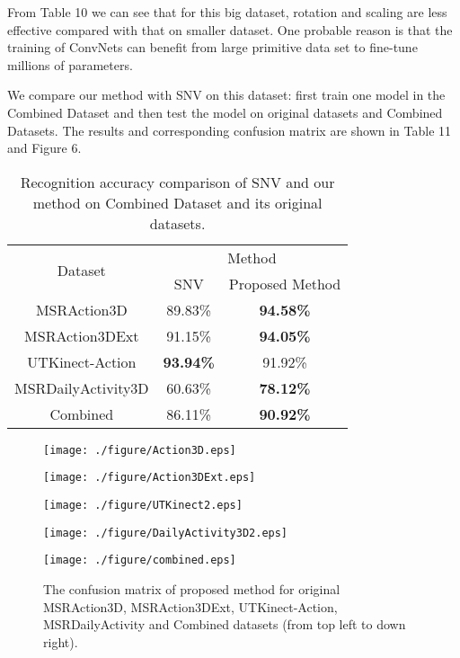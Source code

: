 \documentclass[conference]{IEEEtran}
\begin{document}
From Table 10 we can see that for this big dataset, rotation and scaling are less effective compared with that on smaller dataset. One probable reason is that the training of ConvNets can benefit from large primitive data set to fine-tune millions of parameters.
 
We compare our method with SNV \cite{yangsuper} on this dataset: first train one model in the Combined Dataset and then test the model on original datasets and Combined Datasets. The results and corresponding confusion matrix are shown in Table 11 and Figure 6.
\begin{table}[h]
\centering
\caption{Recognition accuracy comparison of SNV and our method on Combined Dataset and its original datasets.}
\begin{tabular}{|c|c|c|} \hline 
\multirow{2}{*}{Dataset} 
& \multicolumn{2}{c|}{Method}\\
 \cline{2-3}   
 & SNV  & Proposed Method \\ \hline
  MSRAction3D & 89.83\%  & \textbf{94.58\%} \\ \hline
  MSRAction3DExt & 91.15\%  & \textbf{94.05\%} \\ \hline
  UTKinect-Action & \textbf{93.94\%}  & 91.92\% \\ \hline
  MSRDailyActivity3D &60.63\%  & \textbf{78.12\%}  \\ \hline
  Combined  & 86.11\% &   \textbf{90.92\%}  \\ \hline
\end{tabular}
\end{table}

\begin{figure}   
\begin{minipage}[t]{0.5\linewidth} %
\centering   
\texttt{[image: ./figure/Action3D.eps]}     
\label{fig:side:a}   
\end{minipage}%
\begin{minipage}[t]{0.5\linewidth}   
\centering   
\texttt{[image: ./figure/Action3DExt.eps]}     
\label{fig:side:b}   
\end{minipage}   
\begin{minipage}[t]{0.5\linewidth} %
\centering   
\texttt{[image: ./figure/UTKinect2.eps]}     
\label{fig:side:a}   
\end{minipage}%
\begin{minipage}[t]{0.5\linewidth}   
\centering   
\texttt{[image: ./figure/DailyActivity3D2.eps]}     
\label{fig:side:b}   
\end{minipage} 
\begin{minipage}[t]{1\linewidth}   
\centering   
\texttt{[image: ./figure/combined.eps]}     
\label{fig:side:b}   
\end{minipage} 
\caption{The confusion matrix of proposed method for original MSRAction3D, MSRAction3DExt, UTKinect-Action, MSRDailyActivity and Combined datasets (from top left to down right).}  
\end{figure}  
\end{document}
